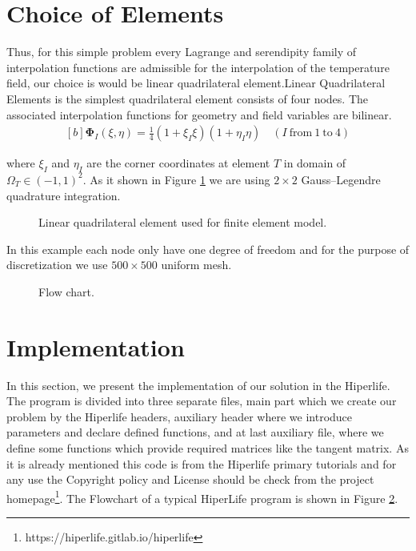 \documentclass[]{article}
\begin{document}
\section{Choice of Elements} \label{sec: coe}
Thus, for this simple problem every Lagrange and serendipity family of interpolation functions are admissible for the interpolation of the temperature field, our choice is would be linear quadrilateral element.Linear  Quadrilateral Elements is the simplest quadrilateral element consists of four nodes. The associated interpolation functions for geometry and ﬁeld variables are bilinear.
\begin{equation}\label{eq13}
	\begin{aligned}[b]
		\boldsymbol{\Phi}_{I}(\xi, \eta) = \frac{1}{4}(1+\xi_I\xi)(1+\eta_I\eta) \quad (I \ \text{from} \ 1 \ \text{to} \ 4)
	\end{aligned}
\end{equation}

where $\xi_{I}$ and $\eta_{I}$ are the corner coordinates at element $T$ in domain of $\Omega_{T} \in (-1,1)^2$. As it shown in Figure \ref{fig_elm} we are using $2 \times 2$ Gauss–Legendre quadrature integration.
\begin{figure}[htbp]
	\centering
	
	\caption{Linear quadrilateral element used for finite element model.}
	\label{fig_elm}
\end{figure}

In this example each node only have one degree of freedom and for the purpose of discretization we use $500 \times 500$ uniform mesh.
\begin{figure}[htbp]
	\centering
	
	\caption{Flow chart.}
	\label{fig_flw}
\end{figure}
\section{Implementation} \label{sec: imp}
In this section, we present the implementation of our solution in the Hiperlife. The program is divided into three separate files, main part which we create our problem by the Hiperlife headers, auxiliary header where we introduce parameters and declare defined functions, and at last auxiliary file, where we define some functions which provide required matrices like the tangent matrix. As it is already mentioned this code is from the Hiperlife primary tutorials and for any use the Copyright policy and License should be check from the project homepage\footnote{ https://hiperlife.gitlab.io/hiperlife}. The Flowchart of a typical HiperLife program is shown in Figure \ref{fig_flw}.
 
\end{document}
